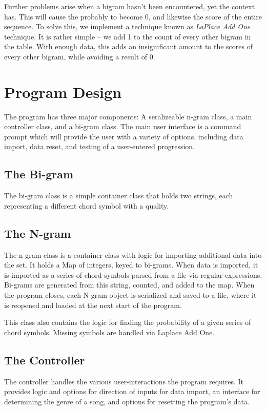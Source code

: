 \documentclass{article}
\begin{document}
Further problems arise when a bigram hasn't been encountered, yet the 
context has. This will cause the probably to become 0, and likewise the
score of the entire sequence. To solve this, we implement a technique 
known as \emph{LaPlace Add One} technique. It is rather simple -- we add
1 to the count of every other bigram in the table. With enough data, this
adds an insignificant amount to the scores of every other bigram,
while avoiding a result of 0.

\newpage

\section{Program Design}
The program has three major components:  A seralizeable n-gram class,
a main controller class, and a bi-gram class.  The main user interface is 
a command prompt which will provide the user with a variety of options,
including data import, data reset, and testing of a user-entered progression.

	\subsection{The Bi-gram}
	The bi-gram class is a simple container class that holds two strings, each 
	representing a different chord symbol with a quality.


		\subsection{The N-gram}
		The n-gram class is a container class with logic for importing additional 
		data into the set.  It holds a Map of integers, keyed to bi-grams.  When 
		data is imported, it is imported as a series of chord symbols parsed 
		from a file via regular expressions.  Bi-grams are generated from this 
		string, counted, and added to the map.  When the program closes, each 
		N-gram object is serialized and saved to a file, where it is reopened and 
		loaded at the next start of the program.

		This class also contains the logic for finding the probability of a given 
		series of chord symbols.  Missing symbols are handled via Laplace Add One.

	\subsection{The Controller}
	The controller handles the various user-interactions the program requires.  
	It provides logic and options for direction of inputs for data import, an 
	interface for determining the genre of a song, and options for resetting 
	the program's data.
\end{document}
